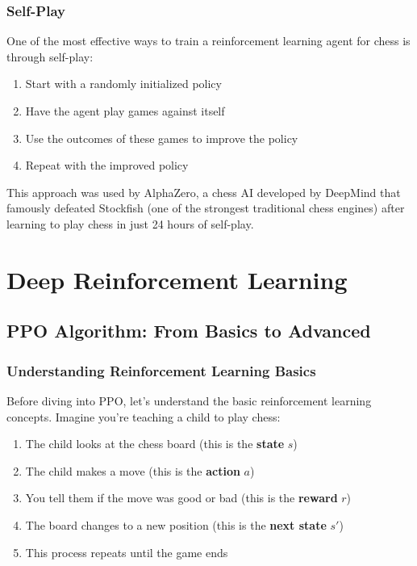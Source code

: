 \documentclass[11pt]{article}
\begin{document}
\subsubsection{Self-Play}

One of the most effective ways to train a reinforcement learning agent for chess is through self-play:
\begin{enumerate}
    \item Start with a randomly initialized policy
    \item Have the agent play games against itself
    \item Use the outcomes of these games to improve the policy
    \item Repeat with the improved policy
\end{enumerate}

This approach was used by AlphaZero, a chess AI developed by DeepMind that famously defeated Stockfish (one of the strongest traditional chess engines) after learning to play chess in just 24 hours of self-play.

\section{Deep Reinforcement Learning}
\subsection{PPO Algorithm: From Basics to Advanced}

\subsubsection{Understanding Reinforcement Learning Basics}

Before diving into PPO, let's understand the basic reinforcement learning concepts. Imagine you're teaching a child to play chess:

\begin{enumerate}
    \item The child looks at the chess board (this is the \textbf{state} $s$)
    \item The child makes a move (this is the \textbf{action} $a$)
    \item You tell them if the move was good or bad (this is the \textbf{reward} $r$)
    \item The board changes to a new position (this is the \textbf{next state} $s'$)
    \item This process repeats until the game ends
\end{enumerate}
\end{document}
